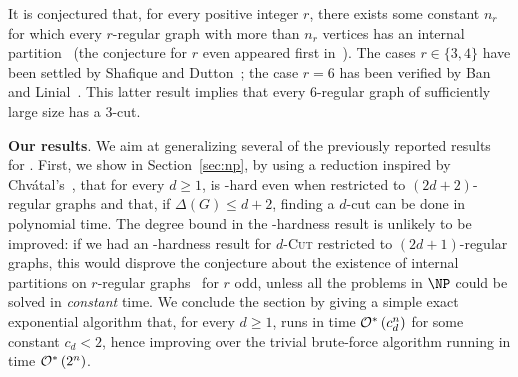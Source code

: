 It is conjectured that, for every positive integer $r$, there exists some constant $n_r$ for which every $r$-regular graph with more than $n_r$ vertices has an internal partition~\cite{DeVos09,internal_partition_regular6} (the conjecture for $r$ even appeared first in~\cite{internal_partition_regular3_4}).
The cases $r \in \{3,4\}$ have been settled by Shafique and Dutton~\cite{internal_partition_regular3_4}; the case $r=6$ has been verified by Ban and Linial~\cite{internal_partition_regular6}.
This latter result implies that every 6-regular graph of sufficiently large size has a 3-cut.

\medskip 

\noindent \textbf{Our results}. We aim at generalizing several of the previously reported results  for .
First, we show in Section~\ref{sec:np}, by using a reduction inspired by Chvátal's~\cite{chvatal_matching_cut}, that for every $d \geq 1$,  is \NP-hard even when restricted to $(2d+2)$-regular graphs and that, if $\Delta(G) \leq d+2$, finding a $d$-cut can be done in polynomial time. The degree bound in the \NP-hardness result is unlikely to be improved: if we had an \NP-hardness result for \textsc{$d$-Cut} restricted to $(2d+1)$-regular graphs, this would disprove the conjecture about the existence of internal partitions on $r$-regular graphs~\cite{DeVos09,internal_partition_regular6,internal_partition_regular3_4} for $r$ odd, unless all the problems in $\NP$ could be solved in {\sl constant} time. We conclude the section by giving a simple exact exponential algorithm that,  for every $d \geq 1$, runs in time $\mathcal{O}^*\left(c_d^n\right)$ for some constant $c_d < 2$, hence improving over the trivial brute-force algorithm running in time $\mathcal{O}^*\left(2^n\right)$.

